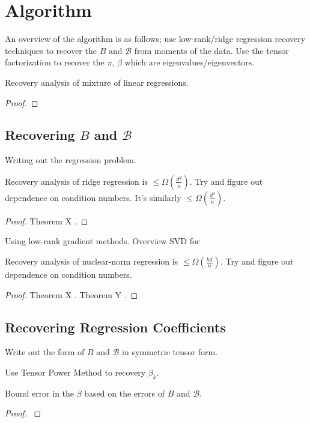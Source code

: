 \section{Algorithm}
\label{sec:algo}

An overview of the algorithm is as follows; use low-rank/ridge regression recovery techniques to recover the $B$ and $\mathcal{B}$ from moments of the data. Use the tensor factorization to recover the $\pi$, $\beta$ which are eigenvalues/eigenvectors.

\begin{theorem}
  Recovery analysis of mixture of linear regressions.
\end{theorem}
\begin{proof}
\end{proof}

\subsection{Recovering $B$ and $\mathcal{B}$}

Writing out the regression problem.

\begin{lemma}
  Recovery analysis of ridge regression is $\le \Omega(\frac{d^2}{n})$.
  Try and figure out dependence on condition numbers. It's similarly
  $\le \Omega(\frac{d^3}{n})$.
\end{lemma}
\begin{proof}
  Theorem X \cite{HsuKakadeZhang2011}.
\end{proof}

Using low-rank gradient methods. Overview SVD for 

\begin{lemma}
  Recovery analysis of nuclear-norm regression is $\le
  \Omega(\frac{kd}{n})$. Try and figure out dependence on condition
  numbers.
\end{lemma}
\begin{proof}
  Theorem X \cite{NegahbanWainwright2009}.
  Theorem Y \cite{Tomioka2011}.
\end{proof}

\subsection{Recovering Regression Coefficients}

Write out the form of $B$ and $\mathcal{B}$ in symmetric tensor form.

Use Tensor Power Method to recovery $\beta_k$.

\begin{lemma}
  Bound error in the $\beta$ based on the errors of $B$ and $\mathcal{B}$.
\end{lemma}
\begin{proof}
  \cite{AnandkumarGeHsu2012}
\end{proof}

